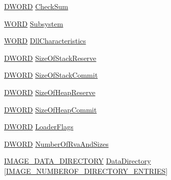 \begin{DoxyCompactItemize}
\item 
\hyperlink{winheader_8h_af483253b2143078cede883fc3c111ad2}{D\-W\-O\-R\-D} \hyperlink{struct___i_m_a_g_e___o_p_t_i_o_n_a_l___h_e_a_d_e_r_adcc66fc35c11f083ceab641028ec19df}{Check\-Sum}
\item 
\hyperlink{winheader_8h_ab24077addd3b7b13e086987ff296552c}{W\-O\-R\-D} \hyperlink{struct___i_m_a_g_e___o_p_t_i_o_n_a_l___h_e_a_d_e_r_a6fcbb9f04ec9507241657a41c3ad26ac}{Subsystem}
\item 
\hyperlink{winheader_8h_ab24077addd3b7b13e086987ff296552c}{W\-O\-R\-D} \hyperlink{struct___i_m_a_g_e___o_p_t_i_o_n_a_l___h_e_a_d_e_r_a27fb50e564e65b74a1142bd6d750aa21}{Dll\-Characteristics}
\item 
\hyperlink{winheader_8h_af483253b2143078cede883fc3c111ad2}{D\-W\-O\-R\-D} \hyperlink{struct___i_m_a_g_e___o_p_t_i_o_n_a_l___h_e_a_d_e_r_ac9dece7a45d07185b526d0649f0da862}{Size\-Of\-Stack\-Reserve}
\item 
\hyperlink{winheader_8h_af483253b2143078cede883fc3c111ad2}{D\-W\-O\-R\-D} \hyperlink{struct___i_m_a_g_e___o_p_t_i_o_n_a_l___h_e_a_d_e_r_af7db7574f2b505a27f089a50a238a43c}{Size\-Of\-Stack\-Commit}
\item 
\hyperlink{winheader_8h_af483253b2143078cede883fc3c111ad2}{D\-W\-O\-R\-D} \hyperlink{struct___i_m_a_g_e___o_p_t_i_o_n_a_l___h_e_a_d_e_r_a5ebdc9fd358469d0d80bb206dbec38d9}{Size\-Of\-Heap\-Reserve}
\item 
\hyperlink{winheader_8h_af483253b2143078cede883fc3c111ad2}{D\-W\-O\-R\-D} \hyperlink{struct___i_m_a_g_e___o_p_t_i_o_n_a_l___h_e_a_d_e_r_ac99c52e38367921f5893dba68f759879}{Size\-Of\-Heap\-Commit}
\item 
\hyperlink{winheader_8h_af483253b2143078cede883fc3c111ad2}{D\-W\-O\-R\-D} \hyperlink{struct___i_m_a_g_e___o_p_t_i_o_n_a_l___h_e_a_d_e_r_ab99b0b489fbcc9a59ec68d6352587bf0}{Loader\-Flags}
\item 
\hyperlink{winheader_8h_af483253b2143078cede883fc3c111ad2}{D\-W\-O\-R\-D} \hyperlink{struct___i_m_a_g_e___o_p_t_i_o_n_a_l___h_e_a_d_e_r_a06931344ed20198b2aa91b25ead063c2}{Number\-Of\-Rva\-And\-Sizes}
\item 
\hyperlink{winheader_8h_a0b3ef87140356b8cb58f4af9eed4d607}{I\-M\-A\-G\-E\-\_\-\-D\-A\-T\-A\-\_\-\-D\-I\-R\-E\-C\-T\-O\-R\-Y} \hyperlink{struct___i_m_a_g_e___o_p_t_i_o_n_a_l___h_e_a_d_e_r_a13806f8ead77941e6fadc0c0e1a38b2b}{Data\-Directory} \mbox{[}\hyperlink{winheader_8h_a75892b738729f0de64146086f462defe}{I\-M\-A\-G\-E\-\_\-\-N\-U\-M\-B\-E\-R\-O\-F\-\_\-\-D\-I\-R\-E\-C\-T\-O\-R\-Y\-\_\-\-E\-N\-T\-R\-I\-E\-S}\mbox{]}
\end{DoxyCompactItemize}


